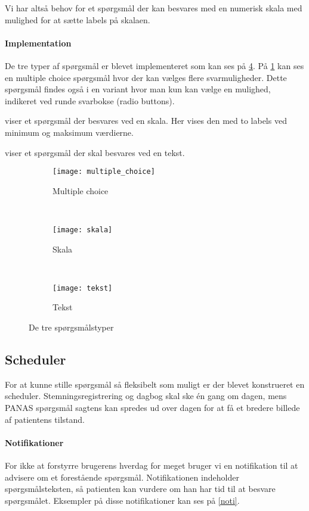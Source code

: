 Vi har altså behov for et spørgsmål der kan besvares med en numerisk skala med mulighed for at sætte labels på skalaen.

\paragraph{Implementation}
De tre typer af spørgsmål er blevet implementeret som kan ses på \cref{sporgsmål}.
På \cref{multi} kan ses en multiple choice spørgsmål hvor der kan vælges flere svarmuligheder.
Dette spørgsmål findes også i en variant hvor man kun kan vælge en mulighed, indikeret ved runde svarbokse (radio buttons).

 viser et spørgsmål der besvares ved en skala. 
Her vises den med to labels ved minimum og maksimum værdierne.

 viser et spørgsmål der skal besvares ved en tekst. 


\begin{figure}
	\centering
	\begin{subfigure}[b]{0.3\textwidth}
		\texttt{[image: multiple\_choice]}
		\caption{Multiple choice}\label{multi}
	\end{subfigure}
	~
	\begin{subfigure}[b]{0.3\textwidth}
		\texttt{[image: skala]}
		\caption{Skala}\label{skala}
	\end{subfigure}
	~
	\begin{subfigure}[b]{0.3\textwidth}
		\texttt{[image: tekst]}
		\caption{Tekst}\label{tekst}
	\end{subfigure}
	\caption{De tre spørgsmålstyper}\label{sporgsmål}
\end{figure}

\subsection{Scheduler}
For at kunne stille spørgsmål så fleksibelt som muligt er der blevet konstrueret en scheduler.
Stemningsregistrering og dagbog skal ske én gang om dagen, mens PANAS spørgsmål sagtens kan spredes ud over dagen for at få et bredere billede af patientens tilstand.


\paragraph{Notifikationer}
For ikke at forstyrre brugerens hverdag for meget bruger vi en notifikation til at advisere om et forestående spørgsmål.
Notifikationen indeholder spørgsmålsteksten, så patienten kan vurdere om han har tid til at besvare spørgsmålet.
Eksempler på disse notifikationer kan ses på \cref{noti}.

